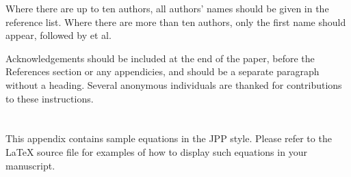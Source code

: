 \documentclass[12pt]{Style/RBM_P}
\begin{document}
Where there are up to ten authors, all authors' names should be given in the reference list. Where there are more than ten authors, only the first name should appear, followed by et al.

Acknowledgements should be included at the end of the paper, before the References section or any appendicies, and should be a separate paragraph without a heading. Several anonymous individuals are thanked for contributions to these instructions.

\appendix

\section{}\label{appA}
This appendix contains sample equations in the JPP style. Please refer to the {\LaTeX} source file for examples of how to display such equations in your manuscript.




% 



% 
\printbibliography
% 
\end{document}
